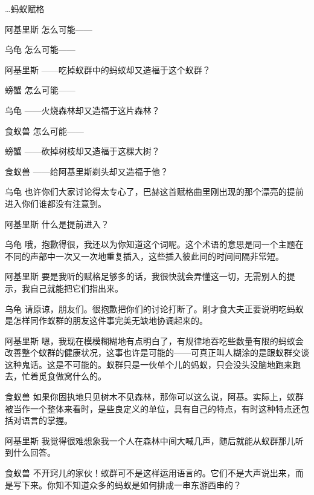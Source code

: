 \begin{dialog}{…蚂蚁赋格}
\begin{dialogue}
\item[阿基里斯]怎么可能——

\item[乌龟]怎么可能——

\item[阿基里斯]——吃掉蚁群中的蚂蚁却又造福于这个蚁群？

\item[螃蟹]怎么可能——

\item[乌龟]——火烧森林却又造福于这片森林？

\item[食蚁兽]怎么可能——

\item[螃蟹]——砍掉树枝却又造福于这棵大树？

\item[食蚁兽]——给阿基里斯剃头却又造福于他？

\item[乌龟]也许你们大家讨论得太专心了，巴赫这首赋格曲里刚出现的那个漂亮的提前进入你们谁都没有注意到。

\item[阿基里斯]什么是提前进入？

\item[乌龟]哦，抱歉得很，我还以为你知道这个词呢。这个术语的意思是同一个主题在不同的声部中一次又一次地重复插入，这些插入彼此间的时间间隔非常短。

\item[阿基里斯]要是我听的赋格足够多的话，我很快就会弄懂这一切，无需别人的提示，我自己就能把它们指出来。

\item[乌龟]请原谅，朋友们。很抱歉把你们的讨论打断了。刚才食大夫正要说明吃蚂蚁是怎样同作蚁群的朋友这件事完美无缺地协调起来的。

\item[阿基里斯]嗯，我现在模模糊糊地有点明白了，有规律地吞吃些数量有限的蚂蚁会改善整个蚁群的健康状况，这事也许是可能的——可真正叫人糊涂的是跟蚁群交谈这种鬼话。这是不可能的。蚁群只是一伙单个儿的蚂蚁，只会没头没脑地跑来跑去，忙着觅食做窝什么的。

\item[食蚁兽]如果你固执地只见树木不见森林，那你可以这么说，阿基。实际上，蚁群被当作一个整体来看时，是些良定义的单位，具有自己的特点，有时这种特点还包括对语言的掌握。

\item[阿基里斯]我觉得很难想象我一个人在森林中间大喊几声，随后就能从蚁群那儿听到什么回答。

\item[食蚁兽]不开窍儿的家伙！蚁群可不是这样运用语言的。它们不是大声说出来，而是写下来。你知不知道众多的蚂蚁是如何排成一串东游西串的？


\end{dialogue}
\end{dialog}
